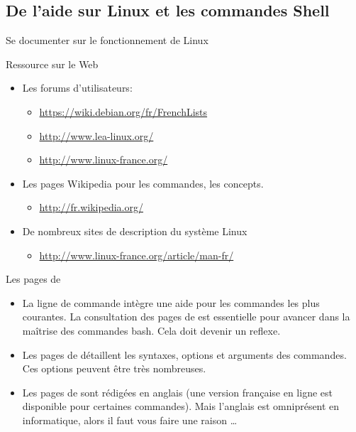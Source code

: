 \subsection{De l'aide sur Linux et les commandes Shell}
\begin{frame}{Se documenter sur le fonctionnement de Linux}
  \begin{block}{Ressource sur le Web}
    \begin{itemize}
    \item Les forums d'utilisateurs:
      \begin{itemize}
      \item \url{https://wiki.debian.org/fr/FrenchLists}
      \item \url{http://www.lea-linux.org/}
      \item \url{http://www.linux-france.org/}
      \end{itemize}
    \item Les pages Wikipedia pour les commandes, les concepts.
      \begin{itemize}
      \item \url{http://fr.wikipedia.org/}
      \end{itemize}
    \item De nombreux sites de description du système Linux
      \begin{itemize}
      \item \url{http://www.linux-france.org/article/man-fr/}
      \end{itemize}
    \end{itemize}
  \end{block}
  \begin{block}{Les pages de }
    \begin{itemize}
    \item La ligne de commande intègre une aide pour les commandes les
      plus courantes. La consultation des pages de  est
      essentielle pour avancer dans la maîtrise des commandes bash. Cela
      doit devenir un reflexe.
    \item Les pages de  détaillent les syntaxes, options et
      arguments des commandes. Ces options peuvent être très nombreuses.
    \item Les pages de  sont rédigées en anglais (une version
      française en ligne est disponible pour certaines commandes). Mais
      l'anglais est omniprésent en informatique, alors il faut vous
      faire une raison \dots
    \end{itemize}
  \end{block}
\end{frame}

